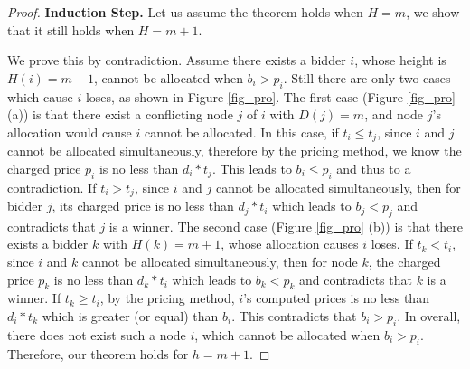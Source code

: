 \documentclass{sig-alternate}
\begin{document}
\begin{proof}
\textbf{Induction Step.} Let us assume the theorem holds when $H=m$, we show that it still holds when $H=m+1$.

We prove this by contradiction. Assume there exists a bidder $i$, whose height is $H(i)=m+1$, cannot be allocated when $b_i > p_i$. Still there are only two cases which cause $i$ loses, as shown in Figure \ref{fig_pro}. The first case (Figure \ref{fig_pro} (a)) is that there exist a conflicting node $j$ of $i$ with $D(j)=m$, and node $j$'s allocation would cause $i$ cannot be allocated. In this case, if $t_i \le t_j$, since $i$ and $j$ cannot be allocated simultaneously, therefore by the pricing method, we know the charged price $p_i$ is no less than $d_i*t_j$. This leads to $b_i \le p_i$ and thus to a contradiction. If $t_i > t_j$, since $i$ and $j$ cannot be allocated simultaneously, then for bidder $j$, its charged price is no less than $d_j*t_i$ which leads to $b_j < p_j$ and contradicts that $j$ is a winner. The second case (Figure \ref{fig_pro} (b)) is that there exists a bidder $k$ with $H(k)=m+1$, whose allocation causes $i$ loses. If $t_k < t_i$, since $i$ and $k$ cannot be allocated simultaneously, then for node $k$, the charged price $p_k$ is no less than $d_k*t_i$ which leads to $b_k < p_k$ and contradicts that $k$ is a winner. If $t_k \ge t_i$, by the pricing method, $i$'s computed prices is no less than $d_i*t_k$ which is greater (or equal) than $b_i$. This contradicts that $b_i > p_i$. In overall, there does not exist such a node $i$, which cannot be allocated when $b_i > p_i$. Therefore, our theorem holds for $h=m+1$.
\end{proof}
\end{document}
